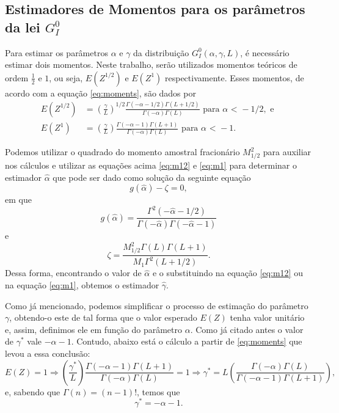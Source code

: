 \subsection{Estimadores de Momentos para os parâmetros da lei $G_I^0$}

Para estimar os parâmetros $\alpha$ e $\gamma$ da distribuição $G_I^0(\alpha, \gamma, L)$, é necessário estimar dois momentos. 
Neste trabalho, serão utilizados momentos teóricos de ordem $\frac{1}{2}$ e $1$, ou seja, $E(Z^{1/2})$ e $E(Z^{1})$ respectivamente. 
Esses momentos, de acordo com a equação \eqref{eq:moments}, são dados por
\begin{align}
    E(Z^{1/2}) &= \left ( \frac{\gamma}{L}\right )^{1/2} \frac{\Gamma(-\alpha-1/2)\Gamma(L+1/2)}{\Gamma(-\alpha)\Gamma(L)}  \text{ para } \alpha \text{ < } -1/2 \label{eq:m12}, \text{ e }\\
    E(Z^{1}) &= \left ( \frac{\gamma}{L}\right ) \frac{\Gamma(-\alpha-1)\Gamma(L+1)}{\Gamma(-\alpha)\Gamma(L)} \text{ para } \alpha \text{ < } -1. \label{eq:m1}
\end{align}

Podemos utilizar o quadrado do momento amostral fracionário $M_{1/2}^2$ para auxiliar nos cálculos e utilizar as equações acima \eqref{eq:m12} e \eqref{eq:m1} para determinar o estimador $\widehat{\alpha}$ que pode ser dado como solução da seguinte equação
\begin{equation}
    g(\widehat{\alpha}) - \zeta = 0,
\end{equation}
em que 
\begin{equation}
    g(\widehat{\alpha}) = \frac{\Gamma^2(-\widehat{\alpha} - 1/2)}{\Gamma(-\widehat{\alpha})\Gamma(-\widehat{\alpha} - 1)}
\end{equation}
e
\begin{equation}
    \zeta = \frac{M_{1/2}^2\Gamma(L)\Gamma(L+1)}{M_{1}\Gamma^2(L+1/2)}.
\end{equation}
Dessa forma, encontrando o valor de $\widehat{\alpha}$ e o substituindo na equação \eqref{eq:m12} ou na equação \eqref{eq:m1}, obtemos o estimador $\widehat{\gamma}$.

Como já mencionado, podemos simplificar o processo de estimação do parâmetro $\gamma$, obtendo-o este de tal forma que o valor esperado $E(Z)$ tenha valor unitário e, assim, definimos ele em função do parâmetro $\alpha$. Como já citado antes o valor de $\gamma^{*}$ vale $-\alpha - 1$. Contudo, abaixo está o cálculo a partir de \eqref{eq:moments} que levou a essa conclusão:
\begin{equation}
    E(Z) = 1 \Rightarrow \left (\frac{\gamma^{*}}{L}\right ) \frac{\Gamma(-\alpha-1)\Gamma(L+1)}{\Gamma(-\alpha)\Gamma(L)} = 1 \Rightarrow \gamma^{*} = L\left ( \frac{\Gamma(-\alpha)\Gamma(L)}{\Gamma(-\alpha-1)\Gamma(L+1)} \right ) ,
\end{equation}
e, sabendo que $\Gamma(n) = (n-1)!$, temos que
\begin{equation}
    \gamma^{*} = -\alpha - 1.
\end{equation}

